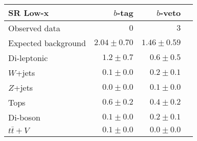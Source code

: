 \begin{tabular*}{\textwidth}{@{\extracolsep{\fill}}lrrr}
\toprule
\textbf{SR Low-x} & $b$-tag &  $b$-veto \\
\midrule

Observed data & $0$ & $3$ \\
\midrule
Expected background & $2.04 \pm 0.70$ & $1.46 \pm 0.59$ \\
\midrule
Di-leptonic & $1.2 \pm 0.7$ & $0.6 \pm 0.5$ \\
$W$+jets & $0.1 \pm 0.0$ & $0.2 \pm 0.1$ \\
$Z$+jets & $0.0 \pm 0.0$ & $0.1 \pm 0.0$ \\
Tops & $0.6 \pm 0.2$ & $0.4 \pm 0.2$ \\
Di-boson & $0.1 \pm 0.0$ & $0.2 \pm 0.1$ \\
$t\bar{t}+V$ & $0.1 \pm 0.0$ & $0.0 \pm 0.0$ \\


\bottomrule
\end{tabular*}




